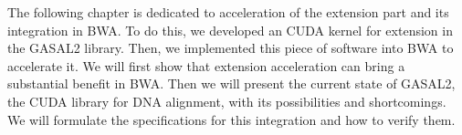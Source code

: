 The following chapter is dedicated to acceleration of the extension part and its integration in BWA. To do this, we developed an CUDA kernel for extension in the GASAL2 library. Then, we implemented this piece of software into BWA to accelerate it.
We will first show that extension acceleration can bring a substantial benefit in BWA. Then we will present the current state of GASAL2, the CUDA library for DNA alignment, with its possibilities and shortcomings. We will formulate the specifications for this integration and how to verify them.